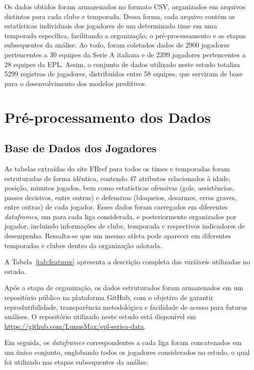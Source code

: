 Os dados obtidos foram armazenados no formato CSV, organizados em arquivos distintos para cada clube e temporada. Dessa forma, cada arquivo contém as estatísticas 
individuais dos jogadores de um determinado time em uma temporada específica, facilitando a organização, o pré-processamento e as etapas subsequentes da análise. 
Ao todo, foram coletados dados de 2900 jogadores pertencentes a 30 equipes da Serie A italiana e de 2399 jogadores pertencentes a 28 equipes da 
EPL. Assim, o conjunto de dados utilizado neste estudo totaliza 5299 registros de jogadores, distribuídos entre 58 equipes, 
que serviram de base para o desenvolvimento dos modelos preditivos.

\section{Pré-processamento dos Dados}

\subsection{Base de Dados dos Jogadores}

As tabelas extraídas do site FBref \cite{fbref} para todos os times e temporadas foram estruturadas de forma idêntica, contendo 47 atributos relacionados à idade, posição, minutos 
jogados, bem como estatísticas ofensivas (gols, assistências, passes decisivos, entre outras) e defensivas (bloqueios, desarmes, erros graves, entre outras) de cada 
jogador. Esses dados foram carregados em diferentes \textit{dataframes}, um para cada liga considerada, e posteriormente organizados por jogador, incluindo informações 
de clube, temporada e respectivos indicadores de desempenho. Ressalta-se que um mesmo atleta pode aparecer em diferentes temporadas e clubes dentro da organização 
adotada.

A Tabela~\ref{tab:features} apresenta a descrição completa das variáveis utilizadas no estudo.



Após a etapa de organização, os dados estruturados foram armazenados em um repositório público na plataforma GitHub, com o objetivo de garantir reprodutibilidade, 
transparência metodológica e facilidade de acesso para futuras análises. O repositório utilizado neste estudo está disponível em 
\url{https://github.com/LunusMax/epl-seriea-data}.

Em seguida, os \textit{dataframes} correspondentes a cada liga foram concatenados em um único conjunto, englobando todos os jogadores considerados no estudo, o qual foi 
utilizado nas etapas subsequentes da análise.

